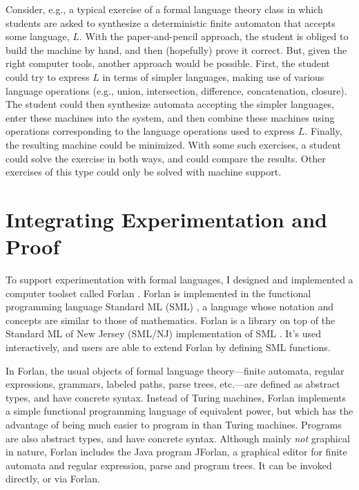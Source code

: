 Consider, e.g., a typical exercise of a formal language theory class
in which students are asked to synthesize a deterministic finite
automaton that accepts some language, $L$.  With the paper-and-pencil
approach, the student is obliged to build the machine by hand, and
then (hopefully) prove it correct.  But, given the right
computer tools, another approach would be possible.  First, the
student could try to express $L$ in terms of simpler languages, making
use of various language operations (e.g., union, intersection,
difference, concatenation, closure).  The student could then
synthesize automata accepting the simpler languages, enter these
machines into the system, and then combine these machines using
operations corresponding to the language operations used to express
$L$.  Finally, the resulting machine could be minimized.  With some
such exercises, a student could solve the exercise in both ways, and
could compare the results.  Other exercises of this type could only be
solved with machine support.

\section*{Integrating Experimentation and Proof}
\label{IntegratingExperimentationAndProof}

To support experimentation with formal languages, I designed and
implemented a computer toolset called Forlan \cite{Stoughton05,
  Stoughton08}.  Forlan is implemented in the functional programming
language Standard ML (SML) \cite{Milner97, Paulson96}, a language
whose notation and concepts are similar to those of mathematics.
Forlan is a library on top of the Standard ML of New Jersey
(SML/NJ) implementation of SML \cite{AppelMacQueen91}.  It's used
interactively, and users are able to extend Forlan by defining SML
functions.

In Forlan, the usual objects of formal language theory---finite
automata, regular expressions, grammars, labeled paths, parse trees,
etc.---are defined as abstract types, and have concrete syntax.
Instead of Turing machines, Forlan implements a simple functional
programming language of equivalent power, but which has the advantage
of being much easier to program in than Turing machines.  Programs are
also abstract types, and have concrete syntax.  Although mainly
\emph{not} graphical in nature, Forlan includes the Java program
JForlan,
%
a graphical editor for finite automata and regular expression, parse
and program trees.  It can be invoked directly, or via Forlan.

